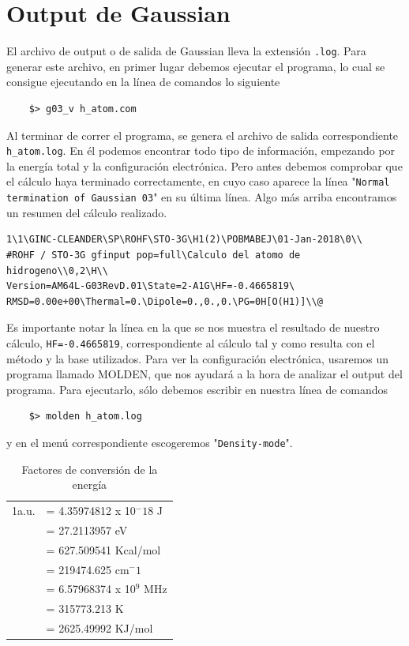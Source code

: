 \documentclass{tufte-book}
\begin{document}
\section{Output de Gaussian}
El archivo de output o de salida de Gaussian lleva la extensión
\texttt{.log}. Para generar este archivo, en primer lugar debemos
ejecutar el programa, lo cual se consigue ejecutando en la línea
de comandos lo siguiente
\begin{verbatim}
    $> g03_v h_atom.com
\end{verbatim}
Al terminar de correr el programa, se genera el archivo de salida
correspondiente \texttt{h\_atom.log}. En él podemos encontrar todo
tipo de información, empezando por la energía total y la 
configuración electrónica. Pero antes debemos comprobar que
el cálculo haya terminado correctamente, en cuyo caso aparece la 
línea "\texttt{Normal termination of Gaussian 03}" en su 
última línea. Algo más arriba encontramos un resumen del
cálculo realizado.
\begin{verbatim}
1\1\GINC-CLEANDER\SP\ROHF\STO-3G\H1(2)\POBMABEJ\01-Jan-2018\0\\
#ROHF / STO-3G gfinput pop=full\Calculo del atomo de hidrogeno\\0,2\H\\
Version=AM64L-G03RevD.01\State=2-A1G\HF=-0.4665819\
RMSD=0.00e+00\Thermal=0.\Dipole=0.,0.,0.\PG=0H[O(H1)]\\@
\end{verbatim}
Es importante notar la línea en la que se nos muestra el resultado
de nuestro cálculo, \texttt{HF=-0.4665819}, correspondiente
al cálculo tal y como resulta con el método y la base utilizados.
Para ver la configuración electrónica, usaremos un programa 
llamado MOLDEN, que nos ayudará a la hora de analizar el output
del programa. Para ejecutarlo, sólo debemos escribir en nuestra
línea de comandos
\begin{verbatim}
    $> molden h_atom.log
\end{verbatim}
y en el menú correspondiente escogeremos "\texttt{Density-mode}".

\begin{table}[h!]
\centering
	\scriptsize
	\begin{tabular}{ll}
     \toprule
		1a.u. & =  4.35974812 x 10$^−18$ J  \\
		         &  =  27.2113957 eV \\
	             &  = 627.509541 Kcal/mol \\ 
		         & = 219474.625 cm$^−1$ \\ 
		        & = 6.57968374 x 10$^9$ MHz \\ 
		        & = 315773.213 K \\
		        & = 2625.49992 KJ/mol \\ 
    \bottomrule
    \end{tabular}
    \caption{Factores de conversión de la energía}
    \label{tb:commands}
\end{table}
\end{document}
